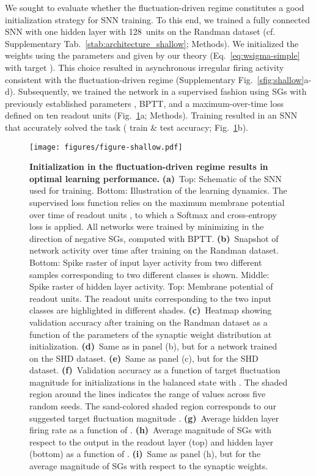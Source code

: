 \documentclass[11pt,a4paper]{article}
\begin{document}
We sought to evaluate whether the fluctuation-driven regime constitutes a good
initialization strategy for \ac{SNN} training.
To this end, we trained a fully connected \ac{SNN} with one hidden layer with
128~units on the Randman dataset (cf. Supplementary Tab.~\ref{stab:architecture_shallow}; Methods).
We initialized the weights using the parameters  and  given
by our theory (Eq.~\eqref{eq:wsigma-simple} with target ).
This choice resulted in asynchronous irregular firing activity consistent with
the fluctuation-driven regime (Supplementary Fig.~\ref{sfig:shallow}a-d). 
Subsequently, we trained the network in a supervised fashion using \acp{SG}
with previously established parameters \citep{Zenke2021-zg}, 
\ac{BPTT}, and a maximum-over-time loss defined on ten
readout units (Fig.~\ref{fig:shallow}a; Methods).
Training resulted in an \ac{SNN} that accurately solved the task ( train \&  test accuracy; Fig.~\ref{fig:shallow}b).

\begin{figure}[tbhp]
    \centering
    \texttt{[image: figures/figure-shallow.pdf]}
    \caption{\textbf{Initialization in the fluctuation-driven regime results in
optimal learning performance.} 
    \textbf{(a)}~Top: Schematic of the \ac{SNN} used for
training.
    Bottom: Illustration of the learning dynamics. The supervised loss
function  relies on the maximum membrane potential
over time of readout units , to which a Softmax and
cross-entropy loss  is applied. All networks were
trained by minimizing  in the direction of negative
\acp{SG}, computed with \ac{BPTT}.
    \textbf{(b)}~Snapshot of network activity over time after training on the
Randman dataset. Bottom: Spike raster of input layer activity from two
different samples corresponding to two different classes is shown. Middle:
Spike raster of hidden layer activity. Top: Membrane potential of readout
units. The readout units corresponding to the two input classes are highlighted
in different shades.
    \textbf{(c)}~Heatmap showing validation accuracy after training on the
Randman dataset as a function of the parameters of the synaptic weight
distribution at initialization. 
    \textbf{(d)}~Same as in panel (b), but for a network trained on the SHD
dataset.
    \textbf{(e)}~Same as panel (c), but for the SHD dataset.
    \textbf{(f)}~Validation accuracy as a function of target fluctuation
magnitude  for initializations in the balanced state with . 
The shaded region around the lines indicates the range of values across five random seeds. The sand-colored shaded region corresponds to our suggested target fluctuation magnitude .
    \textbf{(g)}~Average hidden layer firing rate as a function of
.
    \textbf{(h)}~Average magnitude of \acp{SG} with respect to the 
output in the readout layer (top) and hidden layer (bottom) as a function of
.
    \textbf{(i)}~Same as panel (h), but for the average magnitude of \acp{SG} with respect to the synaptic weights.
    }
    \label{fig:shallow}
\end{figure}
\end{document}
